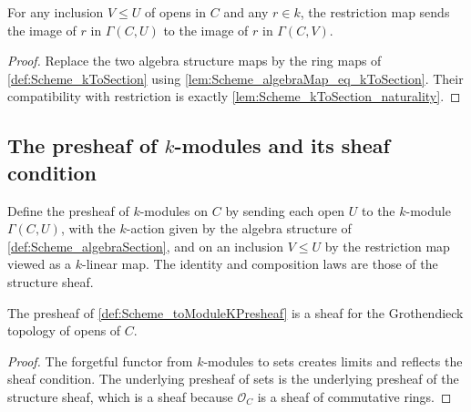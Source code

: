 \begin{lemma}\leanok
  \label{lem:Scheme_algebraMap_naturality}

  For any inclusion \(V \le U\) of opens in \(C\) and any \(r \in k\), the restriction map sends the image of \(r\) in \(\Gamma(C, U)\) to the image of \(r\) in \(\Gamma(C, V)\).
\end{lemma}

\begin{proof}
  
  \leanok
  Replace the two algebra structure maps by the ring maps of \cref{def:Scheme_kToSection} using \cref{lem:Scheme_algebraMap_eq_kToSection}. Their compatibility with restriction is exactly \cref{lem:Scheme_kToSection_naturality}.
\end{proof}

\subsection{The presheaf of \(k\)-modules and its sheaf condition}

\begin{definition}\leanok
  \label{def:Scheme_toModuleKPresheaf}

  Define the presheaf of \(k\)-modules on \(C\) by sending each open \(U\) to the \(k\)-module \(\Gamma(C, U)\), with the \(k\)-action given by the algebra structure of \cref{def:Scheme_algebraSection}, and on an inclusion \(V \le U\) by the restriction map viewed as a \(k\)-linear map. The identity and composition laws are those of the structure sheaf.
\end{definition}

\begin{theorem}\leanok
  \label{thm:Scheme_toModuleKPresheaf_isSheaf}

  The presheaf of \cref{def:Scheme_toModuleKPresheaf} is a sheaf for the Grothendieck topology of opens of \(C\).
\end{theorem}

\begin{proof}
  
  \leanok
  The forgetful functor from \(k\)-modules to sets creates limits and reflects the sheaf condition. The underlying presheaf of sets is the underlying presheaf of the structure sheaf, which is a sheaf because \(\mathcal O_C\) is a sheaf of commutative rings.
\end{proof}

